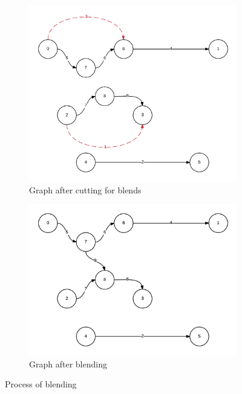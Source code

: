 \documentclass[a4paper,10pt,titlepage,bibliography=totocnumbered]{scrartcl}
\begin{document}
\begin{figure}[h]
\centering
\begin{subfigure}[b]{0.4\textwidth}
	\includegraphics[width=\textwidth]{img/3a_GraphAfterCut.png}
        \caption{Graph after cutting for blends }
        \label{fig:cut}
\end{subfigure}
\begin{subfigure}[b]{0.4\textwidth}
	\includegraphics[width=\textwidth]{img/3b_GraphAfterBlend_0+1.png}
	\caption{Graph after blending}
\label{fig:blended}
\end{subfigure}
\caption{Process of blending}
\label{fig:first_blend}
\end{figure}
\end{document}

